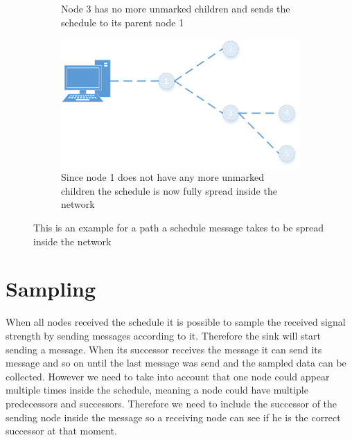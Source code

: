 \begin{figure}[htbp]
\begin{subfigure}[t]{0.4\textwidth}
   	 	\caption{Node 3 has no more unmarked children and sends the schedule to its parent node 1}
    	\label{fig:spreading9}
    \end{subfigure}
    \quad
    \quad	
    \begin{subfigure}[t]{0.4\textwidth}
		\centering         
        \includegraphics[scale=0.6]{content/images/ScheduleSpreading/Part10}
        \caption{Since node 1 does not have any more unmarked children the schedule is now fully spread inside the network}
        \label{fig:spreading10}
    \end{subfigure}
    \caption{This is an example for a path a schedule message takes to be spread inside the network}
     \label{fig:spreading}
\end{figure}

\section{Sampling}
\label{chp:apr_sampling}
When all nodes received the schedule it is possible to sample the received signal strength by sending messages according to it. Therefore the sink will start sending a message. When its successor receives the message it can send its message and so on until the last message was send and the sampled data can be collected. However we need to take into account that one node could appear multiple times inside the schedule, meaning a node could have multiple predecessors and successors. Therefore we need to include the successor of the sending node inside the message so a receiving node can see if he is the correct successor at that moment. 
